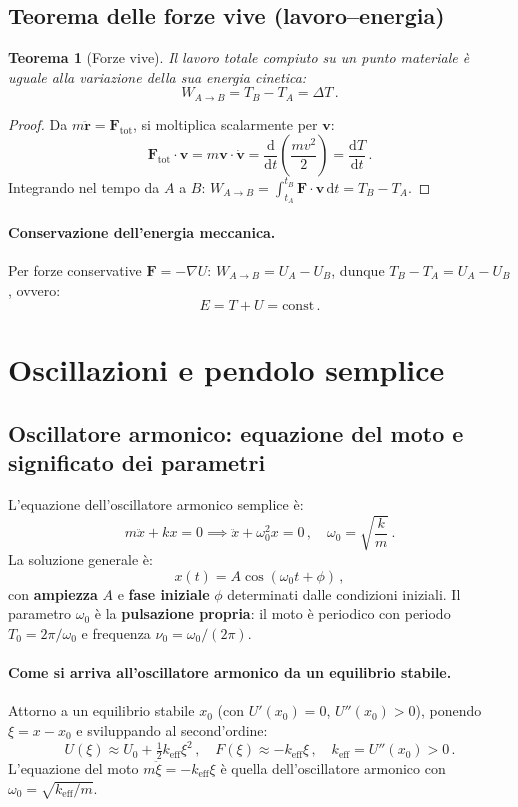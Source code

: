 \documentclass[11pt,a4paper]{article}
\renewcommand{\vec}[1]{\bm{#1}}
\theoremstyle{plain}
\newtheorem{teorema}{Teorema}[section]
\theoremstyle{definition}
\theoremstyle{remark}
\begin{document}
\subsection{Teorema delle forze vive (lavoro–energia)}

\begin{teorema}[Forze vive]
Il lavoro totale compiuto su un punto materiale è uguale alla variazione
della sua energia cinetica:
\[
  W_{A\to B}=T_B-T_A=\Delta T\,.
\]
\end{teorema}
\begin{proof}
Da $m\ddot{\vec{r}}=\vec{F}_\mathrm{tot}$, si moltiplica scalarmente per
$\vec{v}$:
\[
  \vec{F}_\mathrm{tot}\cdot\vec{v}=m\vec{v}\cdot\dot{\vec{v}}=\frac{\mathrm{d}}{\mathrm{d}t}\!\left(\frac{mv^2}{2}\right)=\frac{\mathrm{d}T}{\mathrm{d}t}\,.
\]
Integrando nel tempo da $A$ a $B$:
$W_{A\to B}=\int_{t_A}^{t_B}\vec{F}\cdot\vec{v}\,\mathrm{d}t=T_B-T_A$.
\end{proof}

\paragraph{Conservazione dell'energia meccanica.}
Per forze conservative $\vec{F}=-\nabla U$:
$W_{A\to B}=U_A-U_B$, dunque $T_B-T_A=U_A-U_B$, ovvero:
\[
  E=T+U=\mathrm{const}\,.
\]

\section{Oscillazioni e pendolo semplice}

\subsection{Oscillatore armonico: equazione del moto e significato dei
parametri}

L'equazione dell'oscillatore armonico semplice è:
\[
  m\ddot x+kx=0 \implies \ddot x+\omega_0^2 x=0\,,\quad\omega_0=\sqrt{\frac{k}{m}}\,.
\]
La soluzione generale è:
\[
  x(t)=A\cos(\omega_0 t+\phi)\,,
\]
con \textbf{ampiezza} $A$ e \textbf{fase iniziale} $\phi$ determinati dalle
condizioni iniziali. Il parametro $\omega_0$ è la \textbf{pulsazione propria}:
il moto è periodico con periodo $T_0=2\pi/\omega_0$ e frequenza
$\nu_0=\omega_0/(2\pi)$.

\paragraph{Come si arriva all'oscillatore armonico da un equilibrio stabile.}
Attorno a un equilibrio stabile $x_0$ (con $U'(x_0)=0$, $U''(x_0)>0$),
ponendo $\xi=x-x_0$ e sviluppando al second'ordine:
\[
  U(\xi)\approx U_0+\tfrac{1}{2}k_\mathrm{eff}\xi^2\,,\quad
  F(\xi)\approx -k_\mathrm{eff}\xi\,,\quad
  k_\mathrm{eff}=U''(x_0)>0\,.
\]
L'equazione del moto $m\ddot\xi=-k_\mathrm{eff}\xi$ è quella dell'oscillatore
armonico con $\omega_0=\sqrt{k_\mathrm{eff}/m}$.
\end{document}
